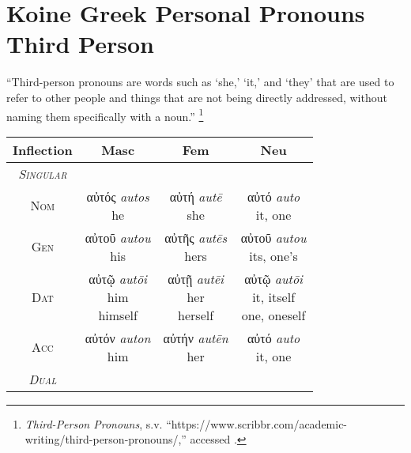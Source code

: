 \documentclass[10pt]{memoir}
\newcommand{\tsc}[1]{\textsc{#1}}
\newcommand{\grc}[1]{\fontspec{Inter}#1}
\newcommand{\trc}[1]{\textit{\fontspec{Tinos}#1}}
\newcommand{\linkfoot}[3]{\footnote{\emph{#1}, s.v. ``{#2},'' accessed \printdate{#3}.}}
\begin{document}
    \section*{Koine Greek Personal Pronouns Third Person}

    ``Third-person pronouns are words such as `she,' `it,' and `they' that are used to refer to other people and things that are not being directly addressed, without naming them specifically with a noun.''
    \linkfoot{Third-Person Pronouns}{https://www.scribbr.com/academic-writing/third-person-pronouns/}{2025-05-13}

    \begin{table}[H]
        \begin{tabular}{c|ccc}
            \textbf{Inflection} & \textbf{Masc} & \textbf{Fem} & \textbf{Neu} \\
            \hline
            \emph{\tsc{Singular}} \\
            \tsc{Nom} & \makecell{\grc{αὐτός} \trc{autos} \\ \small he} & \makecell{\grc{αὐτή} \trc{autē} \\ \small she} & \makecell{\grc{αὐτό} \trc{auto} \\ \small it, one} \\
            \tsc{Gen} & \makecell{\grc{αὐτοῦ} \trc{autou} \\ \small his} & \makecell{\grc{αὐτῆς} \trc{autēs} \\ \small hers} & \makecell{\grc{αὐτοῦ} \trc{autou} \\ \small its, one's} \\
            \tsc{Dat} & \makecell{\grc{αὐτῷ} \trc{autōi} \\ \small him \\ \small himself} & \makecell{\grc{αὐτῇ} \trc{autēi} \\ \small her \\ \small herself} & \makecell{\grc{αὐτῷ} \trc{autōi} \\ \small it, itself \\ \small one, oneself} \\
            \tsc{Acc} & \makecell{\grc{αὐτόν} \trc{auton} \\ \small him} & \makecell{\grc{αὐτήν} \trc{autēn} \\ \small her} & \makecell{\grc{αὐτό} \trc{auto} \\ \small it, one} \\
            \hline
            \emph{\tsc{Dual}} \\

\end{tabular}
\end{table}
\end{document}
